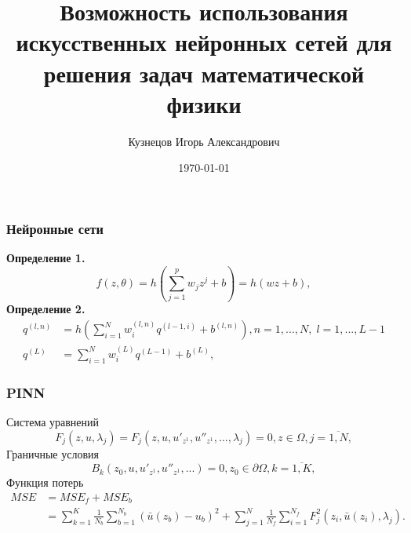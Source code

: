 \documentclass[t]{beamer}
\newcommand{\brr}[1]{{\left( #1 \right)}}
\begin{document}
    \title{Возможность использования искусственных нейронных сетей для решения задач математической физики}
    \author{Кузнецов Игорь Александрович}
    \date{\today}
    \begin{frame}
        \titlepage
    \end{frame}
    \begin{frame}
        \frametitle{Нейронные сети}

        \textbf{Определение 1.}
        \begin{equation*}
            f(z, \theta) = h\brr{\sum_{j=1}^p w_j z^j + b} = h(wz+b),
        \end{equation*}
        \textbf{Определение 2.} 
        \begin{equation*}
            \begin{aligned}
                q^{(l, n)} & = h\brr{\sum_{i=1}^N w_i^{(l,n)}q^{(l-1,i)}+b^{(l,n)}}, n=1,...,N,\; l=1,...,L-1 \\
                q^{(L)}    & ={\sum_{i=1}^N w_i^{(L)}q^{(L-1)}+b^{(L)}},
            \end{aligned}
        \end{equation*}
    \end{frame}
    \begin{frame}
        \frametitle{PINN}
        Система уравнений
        \begin{equation*}\label{eq:1syst}
            F_j(z, u, \lambda_j) = F_j(z, u, u'_{z^1}, u''_{z^1}, ..., \lambda_j) = 0, z\in\Omega, j=\overline{1,N},
        \end{equation*}
        Граничные условия
        \begin{equation*}\label{eq:1bnd}
            B_k(z_0, u, u'_{z^1}, u''_{z^1}, ...) = 0, z_0 \in \partial\Omega, k=\overline{1,K},
        \end{equation*}
        Функция потерь
        \begin{equation*} \label{eq:pinn_loss}
            \begin{aligned}
                MSE & = MSE_f + MSE_b \\
                    & =  \sum_{k=1}^{K}\frac{1}{N_b}\sum_{b=1}^{N_b} (\bar{u}(z_b) - u_b)^2 + \sum_{j=1}^N\frac{1}{N_f}\sum_{i=1}^{N_f} F_j^2(z_i, \bar{u}(z_i), \lambda_j).
            \end{aligned}
        \end{equation*}
    \end{frame}
\end{document}

